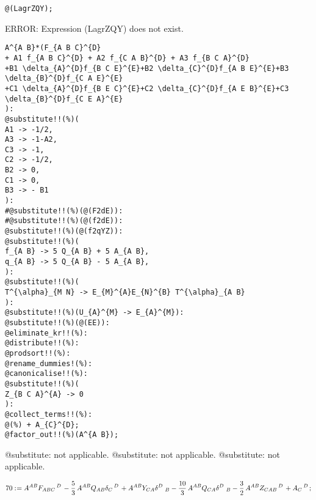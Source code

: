 \documentclass[11pt]{article}
\def\specialcolon{\mathrel{\mathop{:}}\hspace{-.5em}}
\begin{document}
{\color[named]{Blue}\begin{verbatim}
@(LagrZQY);
\end{verbatim}}
{\color[named]{Red}%
ERROR: Expression (LagrZQY) does not exist.%
} %
{\color[named]{Blue}\begin{verbatim}
A^{A B}*(F_{A B C}^{D} 
+ A1 f_{A B C}^{D} + A2 f_{C A B}^{D} + A3 f_{B C A}^{D}
+B1 \delta_{A}^{D}f_{B C E}^{E}+B2 \delta_{C}^{D}f_{A B E}^{E}+B3 \delta_{B}^{D}f_{C A E}^{E}
+C1 \delta_{A}^{D}f_{B E C}^{E}+C2 \delta_{C}^{D}f_{A E B}^{E}+C3 \delta_{B}^{D}f_{C E A}^{E}
):
@substitute!!(%)(
A1 -> -1/2,
A3 -> -1-A2,
C3 -> -1,
C2 -> -1/2,
B2 -> 0,
C1 -> 0,
B3 -> - B1
):
#@substitute!!(%)(@(F2dE)):
#@substitute!!(%)(@(f2dE)):
@substitute!!(%)(@(f2qYZ)):
@substitute!!(%)(
f_{A B} -> 5 Q_{A B} + 5 A_{A B},
q_{A B} -> 5 Q_{A B} - 5 A_{A B},
):
@substitute!!(%)(
T^{\alpha}_{M N} -> E_{M}^{A}E_{N}^{B} T^{\alpha}_{A B}
):
@substitute!!(%)(U_{A}^{M} -> E_{A}^{M}):
@substitute!!(%)(@(EE)):
@eliminate_kr!!(%):
@distribute!!(%):
@prodsort!!(%):
@rename_dummies!(%):
@canonicalise!!(%):
@substitute!!(%)(
Z_{B C A}^{A} -> 0
):
@collect_terms!!(%):
@(%) + A_{C}^{D};
@factor_out!!(%)(A^{A B});
\end{verbatim}}
@substitute: not applicable.
@substitute: not applicable.
@substitute: not applicable.

\begin{dmath*}[compact, spread=2pt]
70\specialcolon{}= {A}^{A B} {F}_{A B C}\,^{D\, } - \frac{5}{3}\, {A}^{A B} {Q}_{A B} {\delta}_{C}\,^{D\, } + {A}^{A B} {Y}_{C A} {\delta}^{D\, }\,_{B} - \frac{10}{3}\, {A}^{A B} {Q}_{C A} {\delta}^{D\, }\,_{B} - \frac{3}{2}\, {A}^{A B} {Z}_{C A B}\,^{D\, } + {A}_{C}\,^{D\, };
\end{dmath*}
\end{document}
